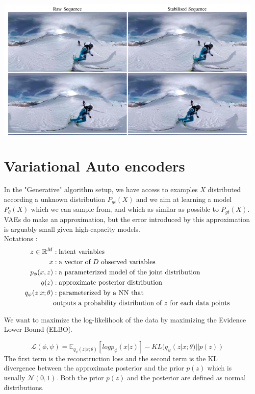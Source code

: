 \documentclass[12pt]{article}
\newcommand{\RR}{\mathbb{R}} %
\newcommand{\EE}{\mathbb{E}} %
\begin{document}
\includegraphics[width=\textwidth]{figures/spherical_video.png}

\section{Variational Auto encoders}
In the "Generative" algorithm setup, we have access to examples $X$ distributed according a unknown distribution $P_{gt}(X)$ and we aim at learning a model $P_{\theta}(X)$ which we can sample from, and 
which as similar as possible to $P_{gt}(X)$. \\
VAEs do make an approximation, but the error introduced by this approximation is arguably small given high-capacity models. \\ 

Notations :
\begin{align*}
    z\in\RR^M &: \textrm{latent variables} \\
    x &: \textmd{a vector of $D$ observed variables} \\
    p_\phi(x, z) &: \textrm{a parameterized model of the joint distribution}\\
    q(z) &: \textrm{approximate posterior distribution} \\
    q_\psi(z|x;\theta) &: \textrm{parameterized by a NN that}\\ 
    &\textrm{outputs a probability distribution of $z$ for each data points}
\end{align*}

We want to maximize the log-likelihook of the data by maximizing the Evidence Lower Bound (ELBO).

$$
\mathcal{L}(\phi, \psi) = \EE_{q_{\psi}(z|x; \theta)}[log p_{\phi}(x|z)] - KL(q_{\psi}(z|x;\theta) || p(z))
$$
The first term is the reconstruction loss and the second term is the KL divergence between the approximate posterior and the prior $p(z)$ which is usually $\mathcal{N}(0, 1)$.
Both the prior $p(z)$ and the posterior are defined as normal distributions.
\end{document}
